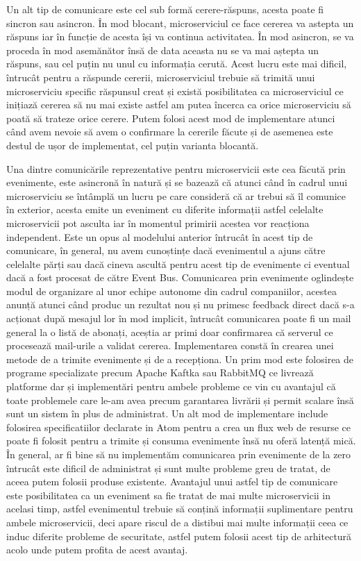 Un alt tip de comunicare este cel sub formă cerere-răspuns, acesta poate fi sincron sau asincron.
În mod blocant, microserviciul ce face cererea va astepta un răspuns iar în funcție de acesta 
își va continua activitatea. În mod asincron, se va proceda în mod asemănător însă de data aceasta nu se
va mai aștepta un răspuns, sau cel puțin nu unul cu informația cerută. Acest lucru este mai dificil,
întrucât pentru a răspunde cererii, microserviciul trebuie să trimită unui microserviciu
specific răspunsul creat și există posibilitatea ca microserviciul ce inițiază cererea să
nu mai existe astfel am putea încerca ca orice microserviciu să poată să trateze orice cerere.
Putem folosi acest mod de implementare atunci când avem nevoie să avem o confirmare la 
cererile făcute și de asemenea este destul de ușor de implementat, cel puțin varianta blocantă.

Una dintre comunicările reprezentative pentru microservicii este cea făcută prin evenimente,
este asincronă în natură și se bazează că atunci când în cadrul unui microserviciu 
se întâmplă un lucru pe care consideră că ar trebui să îl comunice în exterior, acesta 
emite un eveniment cu diferite informații astfel celelalte microservicii pot asculta
iar în momentul primirii acestea vor reacționa independent. Este un opus al modelului anterior
întrucât în acest tip de comunicare, în general, nu avem cunoștințe dacă evenimentul a ajuns
către celelalte părți sau dacă cineva ascultă pentru acest tip de evenimente
ci eventual dacă a fost procesat de către Event Bus. Comunicarea prin evenimente oglindește
modul de organizare al unor echipe autonome din cadrul companiilor, acestea anunță atunci 
când produc un rezultat nou și nu primesc feedback direct dacă s-a acționat după mesajul lor
în mod implicit, întrucât comunicarea poate fi un mail general la o listă de abonați, aceștia
ar primi doar confirmarea că serverul ce procesează mail-urile a validat cererea. Implementarea
constă în crearea unei metode de a trimite evenimente și de a recepționa. Un prim mod
este folosirea de programe specializate precum Apache Kaftka sau RabbitMQ ce livrează 
platforme dar și implementări pentru ambele probleme ce vin cu avantajul că toate problemele
care le-am avea precum garantarea livrării și permit scalare însă sunt un sistem în plus de 
administrat. Un alt mod de implementare include folosirea specificatiilor declarate in
Atom pentru a crea un flux web de resurse ce poate fi folosit pentru a trimite și consuma
evenimente însă nu oferă latență mică. În general, ar fi bine să nu implementăm comunicarea
prin evenimente de la zero întrucât este dificil de administrat și sunt multe probleme greu de
tratat, de aceea putem folosii produse existente. Avantajul unui astfel tip de comunicare
este posibilitatea ca un eveniment sa fie tratat de mai multe microservicii in acelasi timp,
astfel evenimentul trebuie să conțină informații suplimentare pentru ambele microservicii,
deci apare riscul de a distibui mai multe informații ceea ce induc diferite probleme de securitate,
astfel putem folosii acest tip de arhitectură acolo unde putem profita de acest avantaj.

